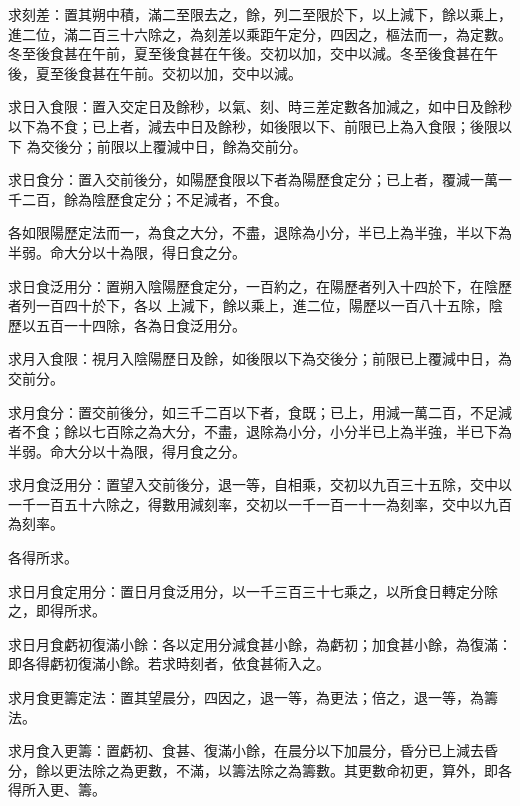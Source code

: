 \begin{pinyinscope}
 求刻差：置其朔中積，滿二至限去之，餘，列二至限於下，以上減下，餘以乘上，進二位，滿二百三十六除之，為刻差以乘距午定分，四因之，樞法而一，為定數。冬至後食甚在午前，夏至後食甚在午後。交初以加，交中以減。冬至後食甚在午後，夏至後食甚在午前。交初以加，交中以減。



 求日入食限：置入交定日及餘秒，以氣、刻、時三差定數各加減之，如中日及餘秒以下為不食；已上者，減去中日及餘秒，如後限以下、前限已上為入食限；後限以下
 為交後分；前限以上覆減中日，餘為交前分。



 求日食分：置入交前後分，如陽歷食限以下者為陽歷食定分；已上者，覆減一萬一千二百，餘為陰歷食定分；不足減者，不食。



 各如限陽歷定法而一，為食之大分，不盡，退除為小分，半已上為半強，半以下為半弱。命大分以十為限，得日食之分。



 求日食泛用分：置朔入陰陽歷食定分，一百約之，在陽歷者列入十四於下，在陰歷者列一百四十於下，各以
 上減下，餘以乘上，進二位，陽歷以一百八十五除，陰歷以五百一十四除，各為日食泛用分。



 求月入食限：視月入陰陽歷日及餘，如後限以下為交後分；前限已上覆減中日，為交前分。



 求月食分：置交前後分，如三千二百以下者，食既；已上，用減一萬二百，不足減者不食；餘以七百除之為大分，不盡，退除為小分，小分半已上為半強，半已下為半弱。命大分以十為限，得月食之分。



 求月食泛用分：置望入交前後分，退一等，自相乘，交初以九百三十五除，交中以一千一百五十六除之，得數用減刻率，交初以一千一百一十一為刻率，交中以九百為刻率。



 各得所求。



 求日月食定用分：置日月食泛用分，以一千三百三十七乘之，以所食日轉定分除之，即得所求。



 求日月食虧初復滿小餘：各以定用分減食甚小餘，為虧初；加食甚小餘，為復滿：即各得虧初復滿小餘。若求時刻者，依食甚術入之。



 求月食更籌定法：置其望晨分，四因之，退一等，為更法；倍之，退一等，為籌法。



 求月食入更籌：置虧初、食甚、復滿小餘，在晨分以下加晨分，昏分已上減去昏分，餘以更法除之為更數，不滿，以籌法除之為籌數。其更數命初更，算外，即各得所入更、籌。




\end{pinyinscope}
